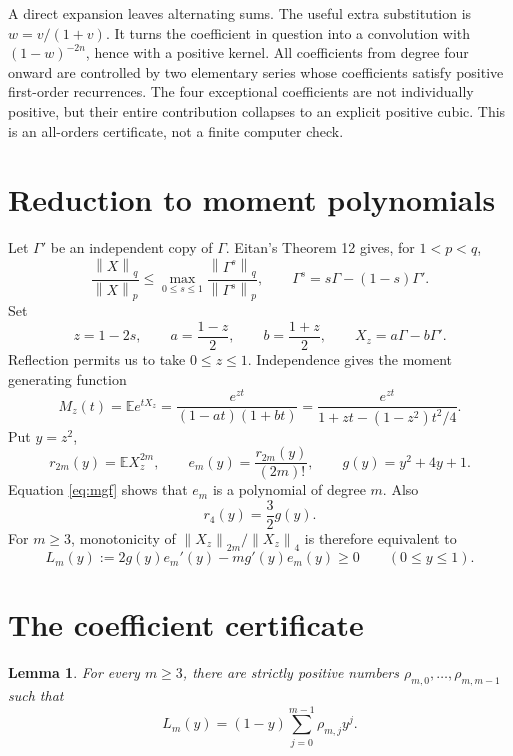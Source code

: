 \documentclass[11pt]{article}
\newtheorem{lemma}{Lemma}
\newcommand{\E}{\mathbb E}
\newcommand{\norm}[1]{\left\lVert #1\right\rVert}
\begin{document}
A direct expansion leaves alternating sums.  The useful extra substitution
is \(w=v/(1+v)\).  It turns the coefficient in question into a convolution
with \((1-w)^{-2n}\), hence with a positive kernel.  All coefficients from
degree four onward are controlled by two elementary series whose
coefficients satisfy positive first-order recurrences.  The four exceptional
coefficients are not individually positive, but their entire contribution
collapses to an explicit positive cubic.  This is an all-orders certificate,
not a finite computer check.

\section{Reduction to moment polynomials}

Let \(\Gamma'\) be an independent copy of \(\Gamma\).  Eitan's Theorem 12
gives, for \(1<p<q\),
\[
 \frac{\norm X_q}{\norm X_p}
 \leq \max_{0\leq s\leq1}
 \frac{\norm{\Gamma^s}_q}{\norm{\Gamma^s}_p},
 \qquad
 \Gamma^s=s\Gamma-(1-s)\Gamma'.
\]
Set
\[
 z=1-2s,\qquad a=\frac{1-z}{2},\qquad b=\frac{1+z}{2},
 \qquad X_z=a\Gamma-b\Gamma'.
\]
Reflection permits us to take \(0\leq z\leq1\).  Independence gives the
moment generating function
\begin{equation}\label{eq:mgf}
 M_z(t)=\E e^{tX_z}
 =\frac{e^{zt}}{(1-at)(1+bt)}
 =\frac{e^{zt}}{1+zt-(1-z^2)t^2/4}.
\end{equation}
Put \(y=z^2\),
\[
 r_{2m}(y)=\E X_z^{2m},\qquad
 e_m(y)=\frac{r_{2m}(y)}{(2m)!},\qquad
 g(y)=y^2+4y+1.
\]
Equation \eqref{eq:mgf} shows that \(e_m\) is a polynomial of degree \(m\).
Also
\begin{equation}\label{eq:r4}
 r_4(y)=\frac32 g(y).
\end{equation}
For \(m\geq3\), monotonicity of \(\norm{X_z}_{2m}/\norm{X_z}_4\)
is therefore equivalent to
\begin{equation}\label{eq:L}
 L_m(y):=2g(y)e_m'(y)-m g'(y)e_m(y)\geq0
 \qquad(0\leq y\leq1).
\end{equation}

\section{The coefficient certificate}

\begin{lemma}\label{lem:positive}
For every \(m\geq3\), there are strictly positive numbers
\(\rho_{m,0},\ldots,\rho_{m,m-1}\) such that
\begin{equation}\label{eq:factor}
 L_m(y)=(1-y)\sum_{j=0}^{m-1}\rho_{m,j}y^j.
\end{equation}
\end{lemma}
\end{document}
